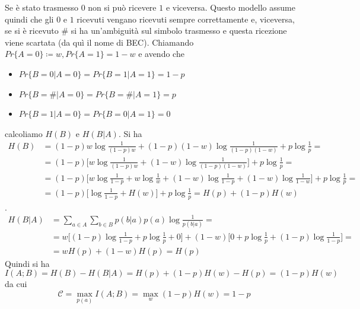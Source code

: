 Se \`e stato trasmesso $0$ non si può ricevere $1$ e viceversa. Questo modello assume quindi che gli $0$ e $1$ ricevuti vengano ricevuti sempre correttamente e, viceversa, se si \`e ricevuto \# si ha un'ambiguit\`a sul simbolo trasmesso e questa ricezione viene scartata (da qu\`i il nome di BEC). Chiamando $Pr\{A=0\} \coloneqq w, Pr\{A=1\} =1-w$ e avendo che
\begin{itemize}
    \item $Pr\{B=0|A=0\} = Pr\{B=1|A=1\} = 1-p$
    \item $Pr\{B=\#|A=0\} = Pr\{B=\#|A=1\} = p$
    \item $Pr\{B=1|A=0\} = Pr\{B=0|A=1\} = 0$
\end{itemize}
calcoliamo $H(B)$ e $H(B|A)$. Si ha
\begin{align*}
    H(B) &= (1-p)w \log \frac{1}{(1-p)w} + (1-p)(1-w)\log \frac{1}{(1-p)(1-w)} + p \log \frac{1}{p} = \\
    &= (1-p) \Big [ w \log \frac{1}{(1-p)w} + (1-w)\log \frac{1}{(1-p)(1-w)} \Big] + p \log \frac{1}{p} = \\
    &=(1-p) \Big [ w \log \frac{1}{1-p} + w \log \frac{1}{w} + (1-w)\log \frac{1}{1-p} + (1-w)\log \frac{1}{1-w} \Big ] + p \log \frac{1}{p} = \\
    &=(1-p) \Big [ \log \frac{1}{1-p} + H(w) \Big] + p \log \frac{1}{p} =H(p) + (1-p)H(w)
\end{align*}.
\begin{align*}
    H(B|A) &= \sum_{a\in A} \sum_{b \in B} p(b|a)p(a) \log \frac{1}{p(b|a)} = \\
    &= w \Big [(1-p) \log \frac{1}{1-p} + p \log \frac{1}{p} + 0 \Big ] + (1-w) \Big [0 + p \log \frac{1}{p} + (1-p) \log \frac{1}{1-p} \Big ] = \\
    &= w H(p) + (1-w)H(p) = H(p)
\end{align*}
Quindi si ha
\begin{equation*}
    I(A;B) = H(B) - H(B|A) = H(p) + (1-p)H(w) - H(p) = (1-p)H(w)
\end{equation*}
da cui
\begin{equation}
    \mathcal{C} = \max_{p(a)} I(A;B) = \max_{w} (1-p)H(w) = 1-p
\end{equation}
